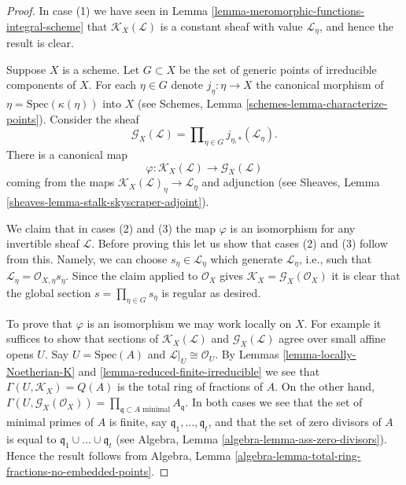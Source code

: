 \begin{proof}
In case (1) we have seen in
Lemma \ref{lemma-meromorphic-functions-integral-scheme}
that $\mathcal{K}_X(\mathcal{L})$ is a constant sheaf
with value $\mathcal{L}_\eta$, and hence the result is clear.

\medskip\noindent
Suppose $X$ is a scheme. Let $G \subset X$ be the set of
generic points of irreducible components of $X$. For each $\eta \in G$
denote $j_\eta : \eta \to X$ the canonical morphism
of $\eta = \text{Spec}(\kappa(\eta))$ into $X$
(see Schemes, Lemma \ref{schemes-lemma-characterize-points}). Consider
the sheaf
$$
\mathcal{G}_X(\mathcal{L})
=
\prod\nolimits_{\eta \in G} j_{\eta, *}(\mathcal{L}_\eta).
$$
There is a canonical map
$$
\varphi :
\mathcal{K}_X(\mathcal{L})
\longrightarrow
\mathcal{G}_X(\mathcal{L})
$$
coming from the maps $\mathcal{K}_X(\mathcal{L})_\eta \to \mathcal{L}_\eta$
and adjunction (see
Sheaves, Lemma \ref{sheaves-lemma-stalk-skyscraper-adjoint}).

\medskip\noindent
We claim that in cases (2) and (3) the map $\varphi$ is an isomorphism
for any invertible sheaf $\mathcal{L}$.
Before proving this let us show that cases (2) and (3) follow from this.
Namely, we can choose $s_\eta \in \mathcal{L}_\eta$ which
generate $\mathcal{L}_\eta$, i.e., such that
$\mathcal{L}_\eta = \mathcal{O}_{X, \eta}s_\eta$.
Since the claim applied to $\mathcal{O}_X$ gives
$\mathcal{K}_X = \mathcal{G}_X(\mathcal{O}_X)$ it is
clear that the global section $s = \prod_{\eta \in G} s_\eta$
is regular as desired.

\medskip\noindent
To prove that $\varphi$ is an isomorphism we may work locally on $X$.
For example it suffices to show that sections of
$\mathcal{K}_X(\mathcal{L})$ and $\mathcal{G}_X(\mathcal{L})$
agree over small affine opens $U$. Say $U = \text{Spec}(A)$ and
$\mathcal{L}|_U \cong \mathcal{O}_U$. By
Lemmas \ref{lemma-locally-Noetherian-K} and
\ref{lemma-reduced-finite-irreducible}
we see that $\Gamma(U, \mathcal{K}_X) = Q(A)$ is
the total ring of fractions of $A$. On the other hand,
$\Gamma(U, \mathcal{G}_X(\mathcal{O}_X)) =
\prod_{\mathfrak q \subset A \text{ minimal}} A_{\mathfrak q}$.
In both cases we see that the set of minimal primes of $A$
is finite, say $\mathfrak q_1, \ldots, \mathfrak q_t$,
and that the set of zero divisors of $A$ is equal to
$\mathfrak q_1 \cup \ldots \cup \mathfrak q_t$ (see
Algebra, Lemma \ref{algebra-lemma-ass-zero-divisors}).
Hence the result follows from
Algebra, Lemma \ref{algebra-lemma-total-ring-fractions-no-embedded-points}.
\end{proof}

